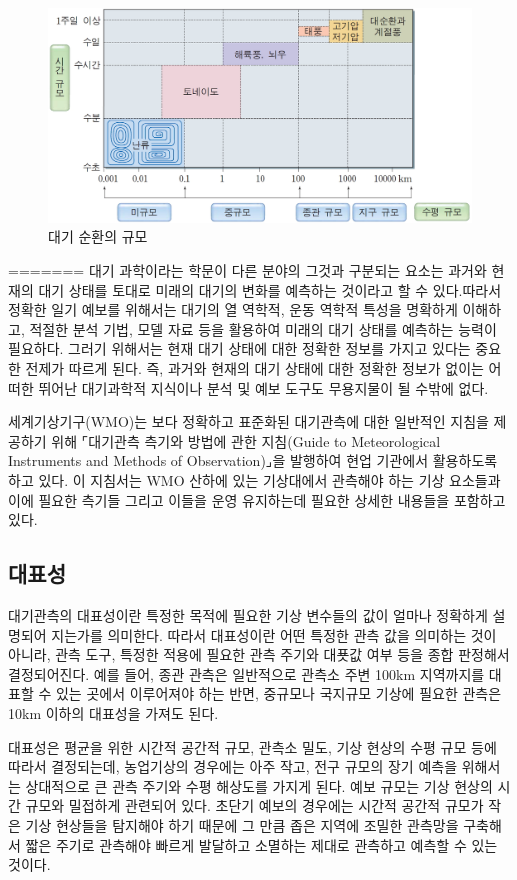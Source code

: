 \begin{figure}
	\centering
	\includegraphics[width=0.8\linewidth]{21observing/images/C-E-o3O-F0-0301-00026-02}
	\caption{대기 순환의 규모}
	\label{fig:c-e-o3o-f0-0301-00026-02}
\end{figure}
=======
대기 과학이라는 학문이 다른 분야의 그것과 구분되는 요소는 과거와 현재의 대기 상태를 토대로 미래의 대기의 변화를 예측하는 것이라고 할 수 있다.따라서 정확한 일기 예보를 위해서는 대기의 열 역학적, 운동 역학적 특성을 명확하게 이해하고, 적절한 분석 기법, 모델 자료 등을 활용하여 미래의 대기 상태를 예측하는 능력이 필요하다. 그러기 위해서는 현재 대기 상태에 대한 정확한 정보를 가지고 있다는 중요한 전제가 따르게 된다. 즉, 과거와 현재의 대기 상태에 대한 정확한 정보가 없이는 어떠한 뛰어난 대기과학적 지식이나 분석 및 예보 도구도 무용지물이 될 수밖에 없다.

세계기상기구(WMO)는 보다 정확하고 표준화된 대기관측에 대한 일반적인 지침을 제공하기 위해 ⌜대기관측 측기와 방법에 관한 지침(Guide to Meteorological Instruments and Methods of Observation)⌟을 발행하여 현업 기관에서 활용하도록 하고 있다. 이 지침서는 WMO 산하에 있는 기상대에서 관측해야 하는 기상 요소들과 이에 필요한 측기들 그리고 이들을 운영 유지하는데 필요한 상세한 내용들을 포함하고 있다. 

\subsection{대표성}

대기관측의 대표성이란 특정한 목적에 필요한 기상 변수들의 값이 얼마나 정확하게 설명되어 지는가를 의미한다. 따라서 대표성이란 어떤 특정한 관측 값을 의미하는 것이 아니라, 관측 도구, 특정한 적용에 필요한 관측 주기와 대푯값 여부 등을 종합 판정해서 결정되어진다. 예를 들어, 종관 관측은 일반적으로 관측소 주변 100km 지역까지를 대표할 수 있는 곳에서 이루어져야 하는 반면, 중규모나 국지규모 기상에 필요한 관측은 10km 이하의 대표성을 가져도 된다.

대표성은 평균을 위한 시간적 공간적 규모, 관측소 밀도, 기상 현상의 수평 규모 등에 따라서 결정되는데, 농업기상의 경우에는 아주 작고, 전구 규모의 장기 예측을 위해서는 상대적으로 큰 관측 주기와 수평 해상도를 가지게 된다. 예보 규모는 기상 현상의 시간 규모와 밀접하게 관련되어 있다.
초단기 예보의 경우에는 시간적 공간적 규모가 작은 기상 현상들을 탐지해야 하기 때문에 그 만큼 좁은 지역에 조밀한 관측망을 구축해서 짧은 주기로 관측해야 빠르게 발달하고 소멸하는 제대로 관측하고 예측할 수 있는 것이다. 

